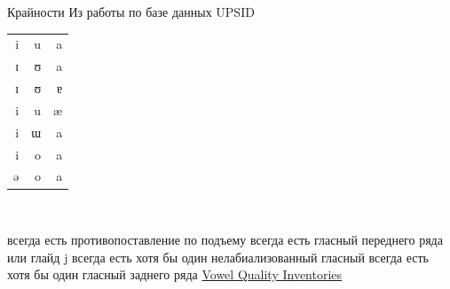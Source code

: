 \begin{frame}{Крайности}
Из работы \citep{hyman08} по базе данных UPSID\\
\begin{tabular}{|r|r|r|}
\hline
i & u     & a \\
ɪ & ʊ     & a \\
ɪ     & ʊ     & ɐ \\
i     & u     & æ \\
i     & ɯ     & a \\
i     & o     & a \\
ə     & o     & a \\
\hline
\end{tabular}
\small
\begin{vowel}
\end{vowel}
\normalsize
\hfill
\small
\begin{vowel}
\end{vowel}
\normalsize
\\
\begin{itemize}

\mytem всегда есть противопоставление по подъему
\mytem всегда есть гласный переднего ряда или глайд j
\mytem всегда есть хотя бы один нелабиализованный гласный
\mytem всегда есть хотя бы один гласный заднего ряда
\mytem \href{http://wals.info/feature/2A}{Vowel Quality Inventories}
\end{itemize}
\end{frame}

